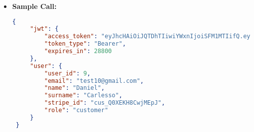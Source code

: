 \begin{itemize}
\begin{itemize}
			\item[$\circ$] \textbf{Code:} 400 Bad Request
			\item[] \textbf{Content:}
			\begin{lstlisting}[language=json]
    {
        "message": {
            "message": "Cannot create the user: Invalid input parameters.",
            "error-code": "EP00",
            "error-details": "Invalid password."
        }
    }
			\end{lstlisting}
		\end{itemize}
    \item \textbf{Sample Call:}
		\begin{lstlisting}[language=json]		
    {
     "jwt": {
         "access_token": "eyJhcHAiOiJQTDhTIiwiYWxnIjoiSFM1MTIifQ.eyJ1aWQiOjksInJvbCI6ImN1c3Rvb WVyIiwic3RyIjoiY3VzX1EwWEVLSDhDd2pNRXBKIiwiZGF0IjoxNzE0MzMzNDg1MTc0fQ .vNtpcCGGvfoikd6yvy4bORjgUq2Q9bqMnI-1F4duXLoNv_5itOah3WaEnfRtst0leH0o Bs7Y5GEQ75NpWMmngA",     
         "token_type": "Bearer",
         "expires_in": 28800
     },
     "user": {
         "user_id": 9,
         "email": "test10@gmail.com",
         "name": "Daniel",
         "surname": "Carlesso",
         "stripe_id": "cus_Q0XEKH8CwjMEpJ",
         "role": "customer"
     }
 }
	\end{lstlisting}
  \end{itemize}		
